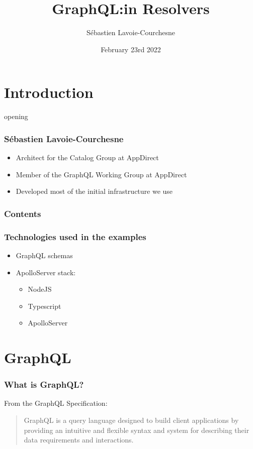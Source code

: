 \documentclass[notes]{beamer}
\title{GraphQL:\@Thinking in Resolvers}
\author{Sébastien Lavoie-Courchesne}
\date{February 23rd 2022}
\begin{document}
\begin{frame}
  \titlepage{}
\end{frame}

\section{Introduction}
\begin{frame}
  opening
\end{frame}


\begin{frame}
  \frametitle{Sébastien Lavoie-Courchesne}
  \begin{itemize}
  \item Architect for the Catalog Group at AppDirect
  \item Member of the GraphQL Working Group at AppDirect
  \item Developed most of the initial infrastructure we use
  \end{itemize}
\end{frame}


\begin{frame}
  \frametitle{Contents}
\end{frame}


\begin{frame}
  \frametitle{Technologies used in the examples}
  \begin{itemize}
  \item GraphQL schemas
  \item ApolloServer stack:
    \begin{itemize}
    \item NodeJS
    \item Typescript
    \item ApolloServer
    \end{itemize}
  \end{itemize}
\end{frame}

\section{GraphQL}
\begin{frame}
  \frametitle{What is GraphQL?}  From the GraphQL
  Specification\cite{graphql-spec}:
  \begin{quote}
    GraphQL is a query language designed to build client applications
    by providing an intuitive and flexible syntax and system for
    describing their data requirements and interactions.
  \end{quote}
\end{frame}
\end{document}
